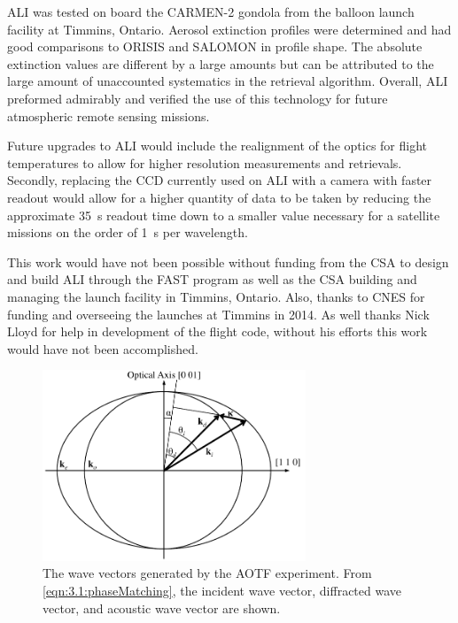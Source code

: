 \documentclass[12pt]{article}
\begin{document}
ALI was tested on board the CARMEN-2 gondola from the balloon launch facility at Timmins, Ontario. Aerosol extinction profiles were determined and had good comparisons to ORISIS and SALOMON in profile shape. The absolute extinction values are different by a large amounts but can be attributed to the large amount of unaccounted systematics in the retrieval algorithm. Overall, ALI preformed admirably and verified the use of this technology for future atmospheric remote sensing missions.

Future upgrades to ALI would include the realignment of the optics for flight temperatures to allow for higher resolution measurements and retrievals. Secondly, replacing the CCD currently used on ALI with a camera with faster readout would allow for a higher quantity of data to be taken by reducing the approximate 35~s readout time down to a smaller value necessary for a satellite missions on the order of 1~s per wavelength.

This work would have not been possible without funding from the CSA to design and build ALI through the FAST program as well as the CSA building and managing the launch facility in Timmins, Ontario. Also, thanks to CNES for funding and overseeing the launches at Timmins in 2014. As well thanks Nick Lloyd for help in development of the flight code, without his efforts this work would have not been accomplished.




\newpage

\begin{figure}
    \begin{center}
    \includegraphics[width=0.7\textwidth]{./Images/3-1-AOTFWavevectorWithRefraction.pdf}
    \caption{The wave vectors generated by the AOTF experiment. From \autoref{eqn:3.1:phaseMatching}, the incident wave vector, diffracted wave vector, and acoustic wave vector are shown.}
    \label{fig:3.1:ATOFWavevectors}
    \end{center}
\end{figure}
\end{document}
